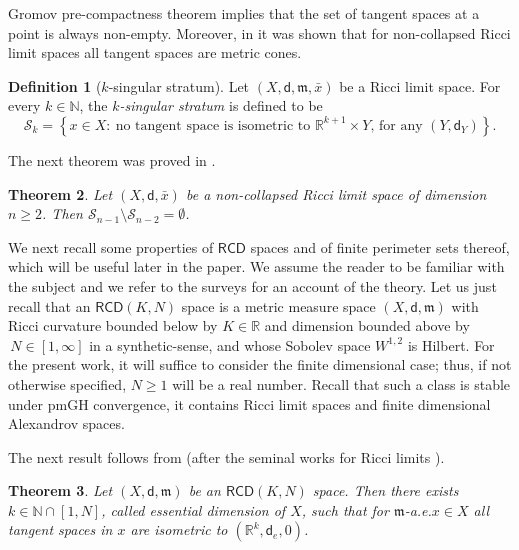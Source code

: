 \documentclass[10pt]{article}
\newtheorem{thm}{Theorem}[section]
\theoremstyle{definition}
\newtheorem{definition}[thm]{Definition}
\newcommand{\bb}[1]{\mathbb{#1}}
\newcommand{\RCD}{\mathsf{RCD}}
\newcommand{\sd}{\mathsf{d}}
\newcommand{\m}{\mathfrak{m}}
\begin{document}
Gromov pre-compactness theorem implies that the set of tangent spaces at a point is always non-empty. Moreover, in \cite{Colding1} it was shown that for non-collapsed Ricci limit spaces all tangent spaces are metric cones.

\begin{definition}[$k$-singular stratum]
    Let $(X,\sd, \m, \bar{x})$ be a Ricci limit space. For every $k \in \bb{N}$, the \emph{$k$-singular stratum} is defined to be 
    \begin{equation*}
        {\mathcal S}_{k} = \left \{x \in X : \ \mbox{no tangent space is isometric to }\bb{R}^{k+1} \times Y \mbox{, for any  }(Y,\sd_Y) \right\}.
    \end{equation*}
\end{definition}

The next theorem was proved in \cite{Colding1}.
\begin{thm} \label{T2}
    Let $(X, \sd, \bar{x})$ be a non-collapsed Ricci limit space of dimension $n \geq 2$. Then $\mathcal{S}_{n-1} \setminus \mathcal{S}_{n-2} = \emptyset$.
\end{thm}



We next recall some  properties of $\RCD$ spaces and of finite perimeter sets thereof, which will be useful later in the paper. We assume the reader to be familiar with the subject and we refer to the surveys \cite{Asurv, SSurv, GSurv} for an account of the theory. Let us just recall that an $\RCD(K,N)$ space is a metric measure space $(X,\sd,\m)$ with Ricci curvature bounded below by $K\in \mathbb{R}$ and dimension bounded above by $ \, N\in [1,\infty]$ in a synthetic-sense, and whose 
 Sobolev space $W^{1,2}$ is Hilbert. For the present work, it will suffice to consider the finite dimensional case; thus, if not otherwise specified, $N\geq 1$ will be a real number.  Recall that  such  a class is stable under pmGH convergence,  it contains Ricci limit spaces and finite dimensional Alexandrov spaces. 
 
 The next result follows from \cite{MondinoNaber,BScon} (after the seminal works for Ricci limits \cite{Colding1, ChCo3, ColdingNaber}).

\begin{thm}\label{thm:EssDim}
    Let $(X,\sd,\m)$ be an $\RCD(K,N)$ space. Then there exists $k \in \bb{N} \cap [1,N]$, called \emph{essential dimension} of $X$, such that for $\m$-a.e.\;$x \in X$ all tangent spaces in $x$ are isometric to $(\bb{R}^k,\sd_e,0)$.
\end{thm}
\end{document}
